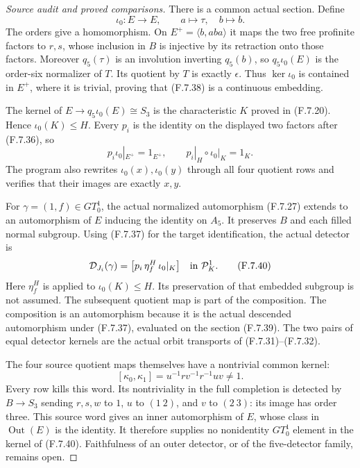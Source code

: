 \begin{proof}[Source audit and proved comparisons]
There is a common actual section. Define
\[
 \iota_0:E\longrightarrow E,\qquad
                a\longmapsto\tau,\quad b\longmapsto b .
                                                               \tag{F.7.38}
\]
The orders give a homomorphism. On
$E^+=\langle b,aba\rangle$ it maps the two free
profinite factors to $r,s$, whose inclusion in
$B$ is injective by its retraction onto those factors.
Moreover $q_5(\tau)$ is an involution inverting
$q_5(b)$, so $q_5\iota_0(E)$ is the order-six
normalizer of $T$. Its quotient by $T$ is
exactly $\epsilon$. Thus $\ker\iota_0$ is contained
in $E^+$, where it is trivial, proving that
(F.7.38) is a continuous embedding.

The kernel of
$E\to q_5\iota_0(E)\cong S_3$ is the characteristic
$K$ proved in (F.7.20). Hence $\iota_0(K)\leq H$.
Every $p_i$ is the identity on the displayed two
factors after (F.7.36), so
\[
 p_i\iota_0|_{E^+}=1_{E^+},\qquad
             p_i|_H\circ\iota_0|_K=1_K.                 \tag{F.7.39}
\]
The program also rewrites $\iota_0(x),\iota_0(y)$
through all four quotient rows and verifies that
their images are exactly $x,y$.

For $\gamma=(1,f)\in GT_0^1$, the actual normalized
automorphism (F.7.27) extends to an automorphism of
$E$ inducing the identity on $A_5$. It preserves
$B$ and each filled normal subgroup.
Using (F.7.37) for the target identification, the
actual detector is
\[
 \mathcal D_{J_i}(\gamma)
        =\bigl[p_i\,\eta_f^H\,\iota_0|_K\bigr]
                          \quad\hbox{in }\mathcal P_K^1.
                                                               \tag{F.7.40}
\]
Here $\eta_f^H$ is applied to $\iota_0(K)\leq H$.
Its preservation of that embedded subgroup is
not assumed. The subsequent quotient map is
part of the composition. The composition is
an automorphism because it is the actual descended
automorphism under (F.7.37), evaluated on the
section (F.7.39).
The two pairs of equal detector kernels are
the actual orbit transports of (F.7.31)--(F.7.32).

The four source quotient maps themselves have
a nontrivial common kernel:
\[
 [\kappa_0,\kappa_1]
           =u^{-1}r v^{-1}r^{-1}uv\ne1.                 \tag{F.7.41}
\]
Every row kills this word.
Its nontriviality in the full completion is
detected by $B\to S_3$ sending $r,s,w$ to $1$,
$u$ to $(1\ 2)$, and $v$ to $(2\ 3)$:
its image has order three.
This source word gives an inner automorphism
of $E$, whose class in $\operatorname{Out}(E)$
is the identity. It therefore supplies no
nonidentity $GT_0^1$ element in the kernel of
(F.7.40). Faithfulness of an outer detector,
or of the five-detector family, remains open.


\end{proof}
